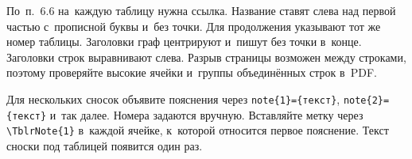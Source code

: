 \documentclass{bmstu}
\begin{document}
По~п.~6.6 на~каждую таблицу нужна ссылка.
Название ставят слева над первой частью с~прописной буквы и~без точки.
Для продолжения указывают тот же номер таблицы.
Заголовки граф центрируют и~пишут без точки в~конце.
Заголовки строк выравнивают слева.
Разрыв страницы возможен между строками, поэтому проверяйте высокие ячейки и~группы объединённых строк в~PDF.

Для нескольких сносок объявите пояснения через \verb|note{1}={текст}|, \verb|note{2}={текст}| и~так далее.
Номера задаются вручную.
Вставляйте метку через \verb|\TblrNote{1}| в~каждой ячейке, к~которой относится первое пояснение.
Текст сноски под таблицей появится один раз.

\end{document}

